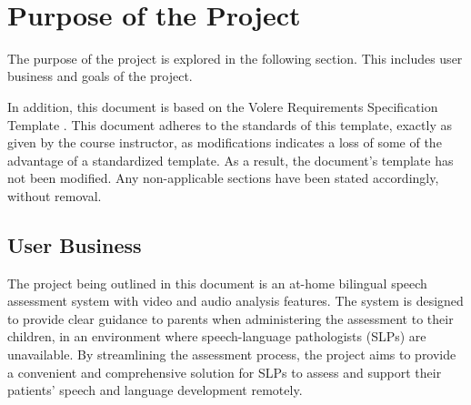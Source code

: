 \documentclass[12pt]{article}
\begin{document}
~\newpage
{}

\section{Purpose of the Project}

\noindent\hspace{2em}The purpose of the project is explored in the following section. This includes
user business and goals of the project.

\noindent\hspace{2em}In addition, this document is based on the Volere Requirements Specification Template \cite{volere}. This document adheres to the standards of this template,
exactly as given by the course instructor, as modifications indicates a loss of some of the advantage of a standardized template. As a result, the document's
template has not been modified. Any non-applicable sections have been stated accordingly, without removal.

\subsection{User Business}
\hspace{2em}The project being outlined in this document is an at-home bilingual speech 
assessment system with video and audio analysis features. The system is designed 
to provide clear guidance to parents when administering the assessment to their 
children, in an environment where speech-language pathologists (SLPs) are 
unavailable. By streamlining the assessment process, the project aims to provide a 
convenient and comprehensive solution for SLPs to assess and support their patients'
speech and language development remotely. 
\end{document}
